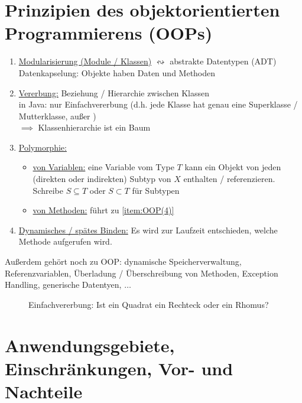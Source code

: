 \section{Prinzipien des objektorientierten Programmierens (OOPs)}
\begin{enumerate}[label=(\arabic*)]
	\item \ul{Modularisierung (Module / Klassen)} $\leftrightsquigarrow$ abstrakte Datentypen (ADT)\\
	Datenkapselung: Objekte haben Daten und Methoden
	\item \ul{Vererbung:} Beziehung / Hierarchie zwischen Klassen\\
	in Java: nur Einfachvererbung (d.h. jede Klasse hat genau eine Superklasse / Mutterklasse, außer )\\
	$\implies$ Klassenhierarchie ist ein Baum
	\item \ul{Polymorphie:}
	\begin{itemize}
		\item \ul{von Variablen:} eine Variable vom Type $T$ kann ein Objekt von jeden (direkten oder indirekten) Subtyp von $X$ enthalten / referenzieren.\\
		Schreibe $S\subseteq T$ oder $S\subset T$ für Subtypen
		\item \ul{von Methoden:} führt zu \ref{item:OOP(4)}
	\end{itemize}
	\item \ul{Dynamisches / spätes Binden:}\label{item:OOP(4)}
	Es wird zur Laufzeit entschieden, welche Methode aufgerufen wird.
\end{enumerate}

Außerdem gehört noch zu OOP: dynamische Speicherverwaltung, Referenzvariablen, Überladung / Überschreibung von Methoden, Exception Handling, generische Datentyen, $\ldots$

\begin{figure}[H] %
	\begin{center}
		
		\caption{Einfachvererbung: Ist ein Quadrat ein Rechteck oder ein Rhomus?}
		\label{Abb:einfachvererbung}
	\end{center}
\end{figure}

\section{Anwendungsgebiete, Einschränkungen, Vor- und Nachteile}


